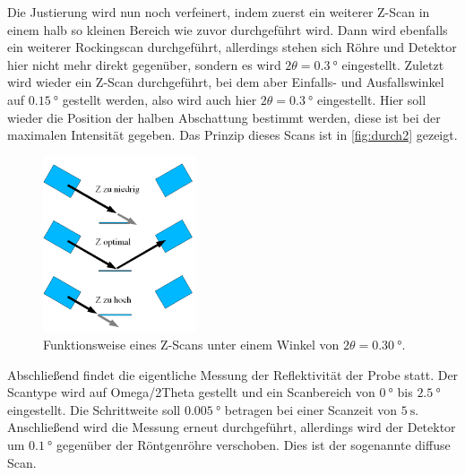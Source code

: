Die Justierung wird nun noch verfeinert, indem zuerst ein weiterer Z-Scan in einem halb so kleinen Bereich wie zuvor durchgeführt wird.
Dann wird ebenfalls ein weiterer Rockingscan durchgeführt, allerdings stehen sich Röhre und Detektor hier nicht mehr direkt gegenüber, 
sondern es wird $2\theta = \SI{0.3}{\degree}$ eingestellt.
Zuletzt wird wieder ein Z-Scan durchgeführt, bei dem aber Einfalls- und Ausfallswinkel auf $\SI{0.15}{\degree}$ gestellt werden, also wird auch hier $2\theta = \SI{0.3}{\degree}$ eingestellt.
Hier soll wieder die Position der halben Abschattung bestimmt werden, diese ist bei der maximalen Intensität gegeben. 
Das Prinzip dieses Scans ist in \autoref{fig:durch2} gezeigt.

\begin{figure}
    \centering
    \includegraphics[width=0.4\textwidth]{images/z.png}
    \caption{Funktionsweise eines Z-Scans unter einem Winkel von $2 \theta = \SI{0.30}{\degree}$. \cite{V44}}
    \label{fig:durch2}
\end{figure}

Abschließend findet die eigentliche Messung der Reflektivität der Probe statt.
Der Scantype wird auf Omega/2Theta gestellt und ein Scanbereich von $\SI{0}{\degree}$ bis $\SI{2.5}{\degree}$ eingestellt.
Die Schrittweite soll $\SI{0.005}{\degree}$ betragen bei einer Scanzeit von $\SI{5}{\second}$.
Anschließend wird die Messung erneut durchgeführt, allerdings wird der Detektor um $\SI{0.1}{\degree}$ gegenüber der Röntgenröhre verschoben.
Dies ist der sogenannte diffuse Scan.
